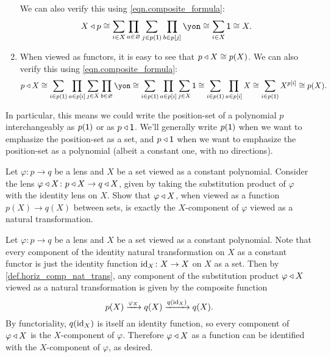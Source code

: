 \documentclass[Book-Poly]{subfiles}
\begin{document}
\begin{exercise}
\begin{solution}
\begin{enumerate}[resume]
    We can also verify this using \eqref{eqn.composite_formula}:
    \[
        X \tri p \iso \sum_{i \in X} \prod_{a \in \varnothing} \sum_{j \in p(\1)} \prod_{b \in p[j]} \yon \iso \sum_{i \in X} \1 \iso X.
    \]
    \item When viewed as functors, it is easy to see that $p \mathbin{\triangleleft} X \cong p(X)$.
    We can also verify this using \eqref{eqn.composite_formula}:
    \[
        p \tri X \iso \sum_{i \in p(\1)} \prod_{a \in p[i]} \sum_{j \in X} \prod_{b \in \varnothing} \yon \iso \sum_{i \in p(\1)} \prod_{a \in p[i]} \sum_{j \in X} \1 \iso \sum_{i \in p(\1)} \prod_{a \in p[i]} X \iso \sum_{i \in p(\1)} X^{p[i]} \iso p(X).
    \]
\end{enumerate}
\end{solution}
\end{exercise}

In particular, this means we could write the position-set of a polynomial $p$ interchangeably as $p(\textsf{1})$ or as $p\mathbin{\triangleleft}\textsf{1}$.
We'll generally write $p(\textsf{1})$ when we want to emphasize the position-set as a set, and $p\mathbin{\triangleleft}\textsf{1}$ when we want to emphasize the position-set as a polynomial (albeit a constant one, with no directions).

\begin{exercise}
Let $\varphi\colon p\to q$ be a lens and $X$ be a set viewed as a constant polynomial.
Consider the lens $\varphi\mathbin{\triangleleft} X\colon p\mathbin{\triangleleft} X\to q\mathbin{\triangleleft} X$, given by taking the substitution product of $\varphi$ with the identity lens on $X$.
Show that $\varphi\mathbin{\triangleleft} X$, when viewed as a function $p(X)\to q(X)$ between sets, is exactly the $X$-component of $\varphi$ viewed as a natural transformation.
\begin{solution}
Let $\varphi\colon p\to q$ be a lens and $X$ be a set viewed as a constant polynomial.
Note that every component of the identity natural transformation on $X$ as a constant functor is just the identity function $\mathrm{id}_X\colon X\to X$ on $X$ as a set.
Then by \cref{def.horiz_comp_nat_trans}, any component of the substitution product $\varphi\mathbin{\triangleleft} X$ viewed as a natural transformation is given by the composite function
\[
    p(X) \xrightarrow{\varphi_X} q(X) \xrightarrow{q(\mathrm{id}_X)} q(X).
\]
By functoriality, $q(\mathrm{id}_X)$ is itself an identity function, so every component of $\varphi\mathbin{\triangleleft} X$ is the $X$-component of $\varphi$.
Therefore $\varphi\mathbin{\triangleleft} X$ as a function can be identified with the $X$-component of $\varphi$, as desired.
\end{solution}
\end{exercise}
\end{document}
